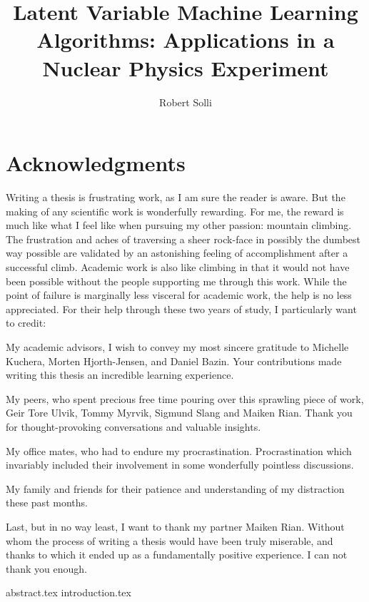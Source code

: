 \documentclass[12pt]{uiofysmaster}
\author{Robert Solli}
\title{Latent Variable Machine Learning Algorithms: Applications in a Nuclear Physics Experiment}
\begin{document}
\maketitle

\tableofcontents
\listoffigures
\listoftodos

\newpage
\section*{Acknowledgments}
Writing a thesis is frustrating work, as I am sure the reader is aware. But the making of any scientific work is wonderfully rewarding. For me, the reward is much like what I feel like when pursuing my other passion: mountain climbing. The frustration and aches of traversing a sheer rock-face in possibly the dumbest way possible are validated by an astonishing feeling of accomplishment after a successful climb. Academic work is also like climbing in that it would not have been possible without the people supporting me through this work. While the point of failure is marginally less visceral for academic work, the help is no less appreciated. For their help through these two years of study, I particularly want to credit: 

My academic advisors, I wish to convey my most sincere gratitude to Michelle Kuchera, Morten Hjorth-Jensen, and Daniel Bazin. Your contributions made writing this thesis an incredible learning experience. 

My peers, who spent precious free time pouring over this sprawling piece of work, Geir Tore Ulvik, Tommy Myrvik, Sigmund Slang and Maiken Rian.  Thank you for thought-provoking conversations and valuable insights. 

My office mates, who had to endure my procrastination. Procrastination which invariably included their involvement in some wonderfully pointless discussions. 

My family and friends for their patience and understanding of my distraction these past months.

Last, but in no way least, I want to thank my partner Maiken Rian. Without whom the process of writing a thesis would have been truly miserable, and thanks to which it ended up as a fundamentally positive experience. I can not thank you enough. 
\newpage

{abstract.tex}
{introduction.tex}

\end{document}
